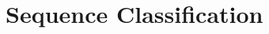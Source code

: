 \documentclass[main.tex]{subfiles}
\begin{document}




\section{Sequence Classification}
\end{document}
